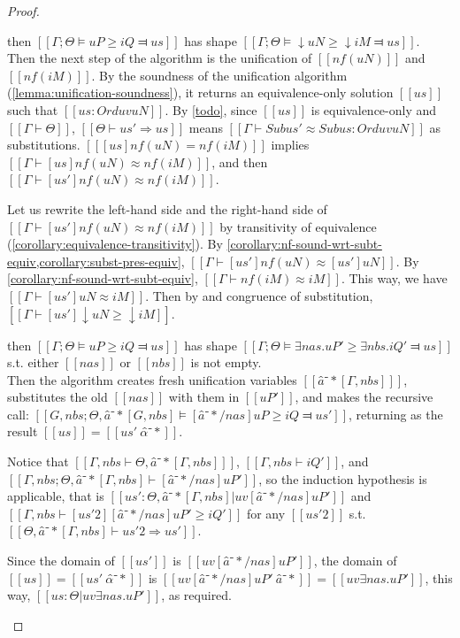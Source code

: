 \begin{proof}
\begin{caseof}
    \item \label{case:pos-subt-soundness:shift} 
      then
    $[[Γ ; Θ ⊨ uP ≥ iQ ⫤ us]]$ has shape $[[Γ;Θ ⊨ ↓uN ≥ ↓iM ⫤ us]]$.\\
    Then the next step of the algorithm is the unification of $[[nf(uN)]]$ and $[[nf(iM)]]$.
    By the soundness of the unification algorithm (\cref{lemma:unification-soundness}),
    it returns an equivalence-only solution $[[us]]$ such that $[[us : Ord uv uN]]$.
    By \cref{todo}, since $[[us]]$ is equivalence-only and $[[Γ ⊢ Θ]]$, $[[Θ ⊢ us' ⇒ us]]$ means 
    $[[ Γ ⊢ Sub us' ≈ Sub us : Ord uv uN ]]$ as substitutions.
    $[[ [us]nf(uN) = nf(iM) ]]$ implies $[[Γ ⊢ [us]nf(uN) ≈ nf(iM)]]$, and then 
        $[[Γ ⊢ [us']nf(uN) ≈ nf(iM)]]$. 

        Let us rewrite the left-hand side and the right-hand side of $[[Γ ⊢ [us']nf(uN) ≈ nf(iM)]]$ by 
        transitivity of equivalence (\cref{corollary:equivalence-transitivity}).
        By \cref{corollary:nf-sound-wrt-subt-equiv,corollary:subst-pres-equiv},
        $[[Γ ⊢ [us']nf(uN) ≈ [us']uN ]]$. By \cref{corollary:nf-sound-wrt-subt-equiv}, 
        $[[Γ ⊢ nf(iM) ≈ iM ]]$. 
        This way, we have $[[Γ ⊢ [us']uN ≈ iM]]$.
        Then by 
        and congruence of substitution, $[[Γ ⊢ [us']↓uN ≥ ↓iM]]$.
    
    \item \label{case:pos-subt-soundness:exists}
        then
        $[[Γ ; Θ ⊨ uP ≥ iQ ⫤ us]]$ has shape $[[Γ;Θ ⊨ ∃nas.uP' ≥ ∃nbs.iQ' ⫤ us]]$ s.t. either $[[nas]]$ or $[[nbs]]$ is not empty.\\
        Then the algorithm creates fresh unification variables $[[â⁻*[Γ,nbs] ]]$, 
        substitutes the old $[[nas]]$ with them in $[[uP']]$, and makes the recursive call:
        $[[G, nbs; Θ, â⁻*[G, nbs] ⊨ [â⁻*/nas] uP ≥ iQ ⫤ us']]$, returning as the result
        $[[us]] = [[us' \ {α̂⁻*}]]$.

        Notice that $[[Γ, nbs ⊢ Θ, â⁻*[Γ, nbs] ]]$, $[[Γ,nbs ⊢ iQ']]$, and 
        $[[Γ,nbs; Θ, â⁻*[Γ, nbs] ⊢ [â⁻*/nas] uP' ]]$, so the induction hypothesis is applicable,
        that is $[[us' : Θ, â⁻*[Γ, nbs] | uv [â⁻*/nas]uP']]$ and $[[ Γ, nbs ⊢ [us'2][â⁻*/nas]uP' ≥ iQ' ]]$ for any
        $[[us'2]]$ s.t. $[[Θ, â⁻*[Γ, nbs] ⊢ us'2 ⇒ us']]$.

        Since the domain of $[[us']]$ is $[[uv [â⁻*/nas]uP']]$, the domain of 
        $[[us]] = [[us' \  {α̂⁻*}]]$ is $[[uv [â⁻*/nas]uP' \ {â⁻*}]] = [[uv ∃nas.uP']]$,
        this way, $[[us : Θ | uv ∃nas.uP']]$, as required.


\end{caseof}
\end{proof}
